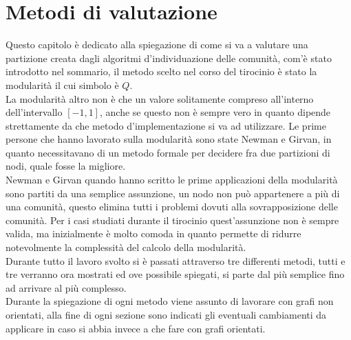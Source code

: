 %
%
%
\chapter{Metodi di valutazione}
Questo capitolo è dedicato alla spiegazione di come si va a valutare una partizione creata dagli algoritmi d'individuazione delle comunità, com'è stato introdotto nel sommario, il metodo scelto nel corso del tirocinio è stato la modularità il cui simbolo è $Q$.\\
La modularità altro non è che un valore solitamente compreso all'interno dell'intervallo $[-1, 1]$, anche se questo non è sempre vero in quanto dipende strettamente da che metodo d'implementazione si va ad utilizzare. Le prime persone che hanno lavorato sulla modularità sono state Newman e Girvan, in quanto necessitavano di un metodo formale per decidere fra due partizioni di nodi, quale fosse la migliore.\\
Newman e Girvan quando hanno scritto le prime applicazioni della modularità sono partiti da una semplice assunzione, un nodo non può appartenere a più di una comunità, questo elimina tutti i problemi dovuti alla sovrapposizione delle comunità. Per i casi studiati durante il tirocinio quest'assunzione non è sempre valida, ma inizialmente è molto comoda in quanto permette di ridurre notevolmente la complessità del calcolo della modularità.\\
Durante tutto il lavoro svolto si è passati attraverso tre differenti metodi, tutti e tre verranno ora mostrati ed ove possibile spiegati, si parte dal più semplice fino ad arrivare al più complesso.\\ Durante la spiegazione di ogni metodo viene assunto di lavorare con grafi non orientati, alla fine di ogni sezione sono indicati gli eventuali cambiamenti da applicare in caso si abbia invece a che fare con grafi orientati.
%
